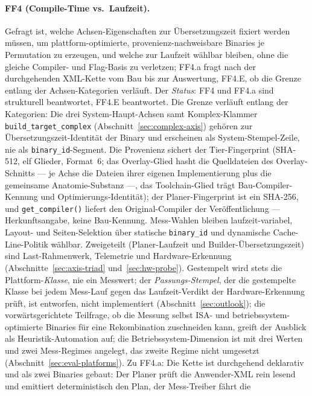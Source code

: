 \begin{nurkurz}
\paragraph{FF4 (Compile-Time vs.\ Laufzeit).} Gefragt ist, welche Achsen-Eigenschaften zur Übersetzungszeit
fixiert werden müssen, um plattform-optimierte, provenienz-nachweisbare Binaries je Permutation zu erzeugen,
und welche zur Laufzeit wählbar bleiben, ohne die gleiche Compiler- und Flag-Basis zu verletzen; FF4.a fragt
nach der durchgehenden XML-Kette vom Bau bis zur Auswertung, FF4.E, ob die Grenze entlang der
Achsen-Kategorien verläuft. Der \emph{Status}: FF4 und FF4.a sind strukturell beantwortet, FF4.E
beantwortet.
Die Grenze verläuft entlang der Kategorien: Die drei System-Haupt-Achsen samt Komplex-Klammer
\texttt{build\_target\_complex} (Abschnitt~\ref{sec:complex-axis}) gehören zur Übersetzungszeit-Identität
der Binary und erscheinen als System-Stempel-Zeile, nie als \texttt{binary\_id}-Segment. Die Provenienz
sichert der Tier-Fingerprint (SHA-512, elf Glieder, Format~6; das Overlay-Glied hasht die Quelldateien
des Overlay-Schnitts --- je Achse die Dateien ihrer eigenen Implementierung plus die gemeinsame
Anatomie-Substanz ---, das Toolchain-Glied trägt Bau-Compiler-Kennung und Optimierungs-Identität); der
Planer-Fingerprint ist ein SHA-256,
und \texttt{get\_compiler()}
liefert den Original-Compiler der Veröffentlichung --- Herkunftsangabe, keine Bau-Kennung. Mess-Wahlen
bleiben laufzeit-variabel, Layout- und Seiten-Selektion über statische \texttt{binary\_id} und dynamische
Cache-Line-Politik wählbar.
Zweigeteilt (Planer-Laufzeit und Builder-Übersetzungszeit) sind Last-Rahmenwerk, Telemetrie und
Hardware-Erkennung (Abschnitte~\ref{sec:axis-triad} und~\ref{sec:hw-probe}).
Gestempelt wird stets die Plattform-\emph{Klasse}, nie ein Messwert; der \emph{Passungs-Stempel}, der die
gestempelte Klasse bei jedem Mess-Lauf gegen das Laufzeit-Verdikt der Hardware-Erkennung prüft, ist
entworfen, nicht implementiert (Abschnitt~\ref{sec:outlook}); die vorwärtsgerichtete Teilfrage, ob die
Messung selbst ISA- und betriebssystem-optimierte Binaries für eine Rekombination zuschneiden kann, greift
der Ausblick als Heuristik-Automation auf; die Betriebssystem-Dimension ist mit drei
Werten und zwei Mess-Regimes angelegt, das zweite Regime nicht umgesetzt
(Abschnitt~\ref{sec:eval-platforms}).
Zu FF4.a: Die Kette ist durchgehend deklarativ und als zwei Binaries gebaut: Der Planer prüft die
Anwender-XML rein lesend und emittiert deterministisch den Plan, der Mess-Treiber fährt die

\end{nurkurz}
